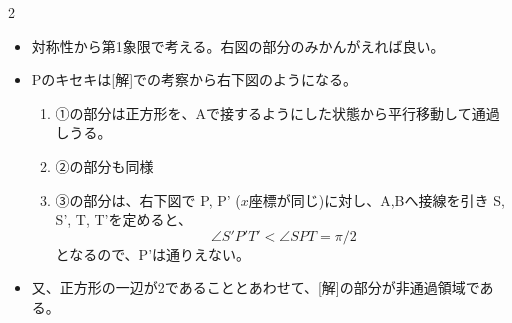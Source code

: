 \documentclass[../../../../main.tex]{subfiles}
\begin{document}
\begin{multicols}{2}
  \begin{itemize}
    \item 対称性から第1象限で考える。右図の部分のみかんがえれば良い。
    \item Pのキセキは[解]での考察から右下図のようになる。
          \begin{enumerate}
            \item ①の部分は正方形を、Aで接するようにした状態から平行移動して通過しうる。
            \item ②の部分も同様
            \item ③の部分は、右下図で P, P' ($x$座標が同じ)に対し、A,Bへ接線を引き S, S', T, T'を定めると、
                  \[ \angle S'P'T' < \angle SPT = \pi/2 \]
                  となるので、P'は通りえない。
          \end{enumerate}
    \item 又、正方形の一辺が2であることとあわせて、[解]の部分が非通過領域である。
  \end{itemize}

  \newpage
\end{multicols}
\end{document}
